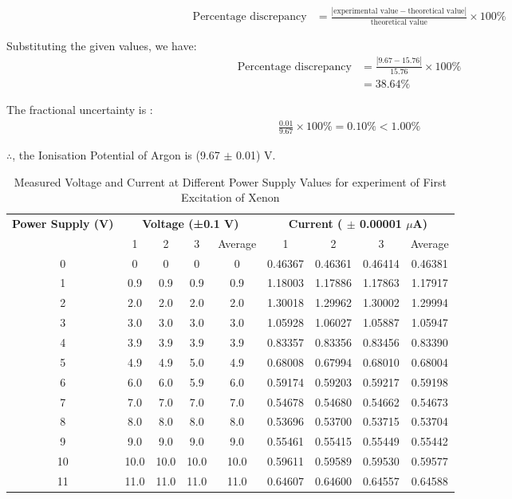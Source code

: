 \documentclass[a4paper,11pt]{article}
\begin{document}
\begin{align*}
\text{Percentage discrepancy} &= \frac{|\text{experimental value} - \text{theoretical value}|}{\text{theoretical value}} \times 100\%
\end{align*}

Substituting the given values, we have:
\begin{align*}
\text{Percentage discrepancy}&= \frac{|9.67 -15.76 |}{15.76} \times 100\% \\
&= 38.64 \%
\end{align*}

The fractional uncertainty is :
\begin{align*}
\frac{0.01}{9.67} \times 100 \% = 0.10 \%<1.00 \%
\end{align*}

$\therefore$, the Ionisation Potential of Argon is (9.67 $\pm$ 0.01) V.


\newpage
\begin{table}[h!]
\small
\centering
\begin{tabular}{ccccccccc}
\toprule
\multicolumn{1}{c}{\textbf{Power Supply (V)}} & \multicolumn{4}{c}{\textbf{Voltage (±0.1 V)}} & \multicolumn{4}{c}{\textbf{Current ( $\pm$ 0.00001 $\mu$A)}} \\
\cmidrule(lr){2-5} \cmidrule(lr){6-9}
& 1 & 2 & 3 & Average & 1 & 2 & 3 & Average \\
\midrule
0  & 0     & 0     & 0     & 0     & 0.46367 & 0.46361 & 0.46414 & 0.46381 \\
1  & 0.9   & 0.9   & 0.9   & 0.9   & 1.18003 & 1.17886 & 1.17863 & 1.17917 \\
2  & 2.0   & 2.0   & 2.0   & 2.0   & 1.30018 & 1.29962 & 1.30002 & 1.29994 \\
3  & 3.0   & 3.0   & 3.0   & 3.0   & 1.05928 & 1.06027 & 1.05887 & 1.05947 \\
4  & 3.9   & 3.9   & 3.9   & 3.9   & 0.83357 & 0.83356 & 0.83456 & 0.83390 \\
5  & 4.9   & 4.9   & 5.0   & 4.9   & 0.68008 & 0.67994 & 0.68010 & 0.68004 \\
6  & 6.0   & 6.0   & 5.9   & 6.0   & 0.59174 & 0.59203 & 0.59217 & 0.59198 \\
7  & 7.0   & 7.0   & 7.0   & 7.0   & 0.54678 & 0.54680 & 0.54662 & 0.54673 \\
8  & 8.0   & 8.0   & 8.0   & 8.0   & 0.53696 & 0.53700 & 0.53715 & 0.53704 \\
9  & 9.0   & 9.0   & 9.0   & 9.0   & 0.55461 & 0.55415 & 0.55449 & 0.55442 \\
10 & 10.0  & 10.0  & 10.0  & 10.0  & 0.59611 & 0.59589 & 0.59530 & 0.59577 \\
11 & 11.0  & 11.0  & 11.0  & 11.0  & 0.64607 & 0.64600 & 0.64557 & 0.64588 \\
\bottomrule
\end{tabular}
\caption{Measured Voltage and Current at Different Power Supply Values for experiment of First Excitation of Xenon}
\label{tab:measurements}
\end{table}
\end{document}

